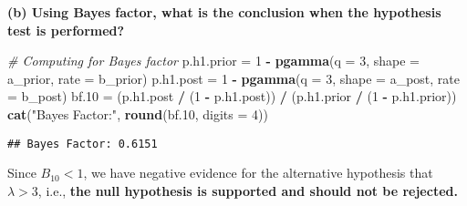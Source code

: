 \documentclass[]{article}
\newenvironment{Shaded}{\begin{snugshade}}{\end{snugshade}}
\newcommand{\AttributeTok}[1]{\textcolor[rgb]{0.13,0.29,0.53}{#1}}
\newcommand{\CommentTok}[1]{\textcolor[rgb]{0.56,0.35,0.01}{\textit{#1}}}
\newcommand{\DecValTok}[1]{\textcolor[rgb]{0.00,0.00,0.81}{#1}}
\newcommand{\FloatTok}[1]{\textcolor[rgb]{0.00,0.00,0.81}{#1}}
\newcommand{\FunctionTok}[1]{\textcolor[rgb]{0.13,0.29,0.53}{\textbf{#1}}}
\newcommand{\NormalTok}[1]{#1}
\newcommand{\OtherTok}[1]{\textcolor[rgb]{0.56,0.35,0.01}{#1}}
\newcommand{\SpecialCharTok}[1]{\textcolor[rgb]{0.81,0.36,0.00}{\textbf{#1}}}
\newcommand{\StringTok}[1]{\textcolor[rgb]{0.31,0.60,0.02}{#1}}
\begin{document}
\begin{enumerate}
\textbf{(b) Using Bayes factor, what is the conclusion when the hypothesis test is performed?}

\begin{Shaded}
\begin{Highlighting}[]
\CommentTok{\# Computing for Bayes factor}
\NormalTok{p.h1.prior }\OtherTok{=} \DecValTok{1} \SpecialCharTok{{-}} \FunctionTok{pgamma}\NormalTok{(}\AttributeTok{q =} \DecValTok{3}\NormalTok{, }\AttributeTok{shape =}\NormalTok{ a\_prior, }\AttributeTok{rate =}\NormalTok{ b\_prior)}
\NormalTok{p.h1.post }\OtherTok{=} \DecValTok{1} \SpecialCharTok{{-}} \FunctionTok{pgamma}\NormalTok{(}\AttributeTok{q =} \DecValTok{3}\NormalTok{, }\AttributeTok{shape =}\NormalTok{ a\_post, }\AttributeTok{rate =}\NormalTok{ b\_post)}
\NormalTok{bf}\FloatTok{.10} \OtherTok{=}\NormalTok{ (p.h1.post }\SpecialCharTok{/}\NormalTok{ (}\DecValTok{1} \SpecialCharTok{{-}}\NormalTok{ p.h1.post)) }\SpecialCharTok{/}\NormalTok{ (p.h1.prior }\SpecialCharTok{/}\NormalTok{ (}\DecValTok{1} \SpecialCharTok{{-}}\NormalTok{ p.h1.prior))}
\FunctionTok{cat}\NormalTok{(}\StringTok{"Bayes Factor:"}\NormalTok{, \FunctionTok{round}\NormalTok{(bf}\FloatTok{.10}\NormalTok{, }\AttributeTok{digits =} \DecValTok{4}\NormalTok{))}}
\end{Highlighting}
\end{Shaded}

\begin{verbatim}
## Bayes Factor: 0.6151
\end{verbatim}
\hfill

Since $B_{10} < 1$, we have negative evidence for the alternative hypothesis that $\lambda > 3$, i.e., \textbf{the null hypothesis is supported and should not be rejected.}

\end{enumerate}
\end{document}
